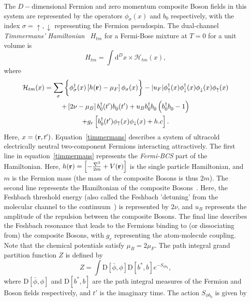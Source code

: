 \documentclass[a4paper,10pt]{article}
\begin{document}
The $D-$dimensional Fermion and zero momentum composite Boson fields in this system are represented by the operators  $\phi_\sigma(x)$ and $b_0$  respectively, with the index $\sigma = \uparrow,\downarrow$ representing the Fermion pseudospin. The dual-channel \textit{Timmermans' Hamiltonian}~\cite{timmermans} $H_{tm}$ for a Fermi-Bose mixture at $T=0$ for a unit volume is 
\begin{equation}
 H_{tm} = \int{{\mathrm d}^Dx} \times {\mathcal H_{tm}} (x),
\end{equation}
where
\begin{multline}
\label{timmermans}
{\mathcal H_{tm}}(x) =  \sum_{\sigma} \bigg\{ \phi^\dagger_\sigma(x) \left[h({\bf r})-\mu_F\right]\phi_\sigma(x) \bigg \} - |u_F| \phi^\dagger_\uparrow(x)\phi^\dagger_\downarrow(x)\phi^{}_\downarrow(x)\phi^{}_\uparrow(x)\\ 
+\left[ 2\nu-\mu_B \right]b^\dagger_0(t')b^{ }_0(t')+ u_B b^\dagger_0b^{ }_0\left(b^\dagger_0b^{ }_0-1 \right)\\
+g_r\left[b^\dagger_0(t') \phi_\uparrow(x) \phi_\downarrow(x) + h.c\right].
\end{multline}
Here, $x=({\bf r},t')$. Equation~\ref{timmermans} describes a system of ultracold electrically neutral two-component Fermions interacting attractively. The first line in equation~\ref{timmermans} represents the \textit{Fermi-BCS} part of the Hamiltonian. Here, $h({\bf r})=\left[ - \frac{\nabla^2}{2m}+V({\bf r}) \right]$ is the single particle Hamiltonian, and $m$ is the Fermion mass (the mass of the composite Bosons is thus $2m$). The second line represents the Hamiltonian of the composite Bosons~\cite{timmermans, huang:becbcs2}. Here, the Feshbach threshold energy (also called the Feshbach 'detuning' from the molecular channel to the continuum~\cite{timmermans}) is represented by $2\nu$, and $u_B$ represents the amplitude of the repulsion between the composite Bosons. The final line describes the Feshbach resonance that leads to the Fermions binding to (or dissociating from) the composite Bosons, with  $g_r$ representing the atom-molecule coupling. Note that the chemical potentials satisfy $\mu_B=2\mu_F$. The path integral grand partition function $Z$ is defined by
\begin{equation}
\label{pathintegral}
 Z=\int{{\mathrm D}[\bar{\phi},\phi]{\mathrm D}[b^*,b]}e^{-S_{\phi b^{ }_0}},
\end{equation}
where ${\mathrm D}[\bar{\phi},\phi]$ and ${\mathrm D}[b^*,b]$ are the path integral measures of the Fermion and Boson fields respectively, and $t'$ is the imaginary time. The action $S_{\phi b^{ }_0}$ is given by
\end{document}
